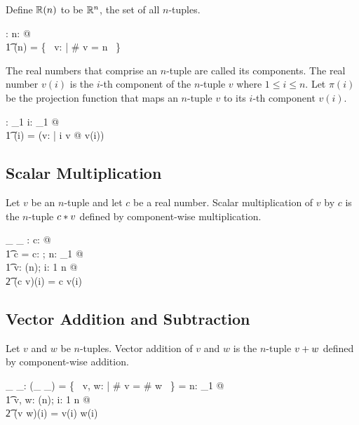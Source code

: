 \documentclass[11pt, oneside]{article}
\begin{document}
Define $\mathbb{R}(n)$ to be $\mathbb{R}^n$, the set of all $n$-tuples.
\begin{axdef}
	\Rtuples: \nat \fun \power \Rinf
\where
	\forall n: \nat @ \\
	\t1	\Rtuples(n) = \{~ v: \Rinf | \# v = n ~\}
\end{axdef}

The real numbers that comprise an $n$-tuple are called its components.
The real number $v(i)$ is the $i$-th component of the $n$-tuple $v$ where
$1 \le i \le n$.
Let $\pi(i)$ be the projection function that maps an $n$-tuple $v$ to its $i$-th component $v(i)$.

\begin{axdef}
	\pi: \nat_1 \fun \Rinf \pfun \R
\where
	\forall i: \nat_1 @ \\
	\t1	\pi(i) = (\lambda v: \Rinf | i \in \dom v @ v(i))
\end{axdef}

\subsection{Scalar Multiplication}

Let $v$ be an $n$-tuple and let $c$ be a real number.
Scalar multiplication of $v$ by $c$ is the $n$-tuple $c \mathbin{*} v$ defined by component-wise multiplication.

\begin{axdef}
	\_ \smulR \_ : \R \cross \Rinf \fun \Rinf 
\where
	\forall c: \R @ \\
	\t1	c \smulR \langle \rangle = \langle \rangle
\also
	\forall c: \R; n: \nat_1 @ \\
	\t1	\forall v: \Rtuples(n); i: 1 \upto n @ \\
	\t2		(c \smulR v)(i) = c \mulR v(i)
\end{axdef}

\subsection{Vector Addition and Subtraction}

Let $v$ and $w$ be $n$-tuples.
Vector addition of $v$ and $w$ is the $n$-tuple $v \mathbin{+} w$ defined by component-wise addition.

\begin{axdef}
	\_ \vaddR \_: \Rinf \cross \Rinf \pfun \Rinf
\where
	\dom(\_ \vaddR \_) = \{~ v, w: \Rinf | \# v = \# w ~\}
\also
	\langle \rangle \vaddR \langle \rangle = \langle \rangle
\also
	\forall n: \nat_1 @ \\
	\t1	\forall v, w: \Rtuples(n); i: 1 \upto n @ \\
	\t2		(v \vaddR w)(i) = v(i) \addR w(i)
\end{axdef}
\end{document}
